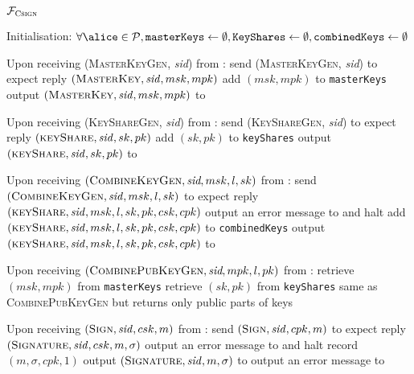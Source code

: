 \begin{systembox}{$\mathcal{F}_{\textsc{Csign}}$}
  \begin{algorithmic}[1]
    \State Initialisation:
    \Indent
      \State $\forall \alice \in \mathcal{P}, \mathtt{masterKeys} \gets
      \emptyset, \mathtt{KeyShares} \gets \emptyset, \mathtt{combinedKeys}
      \gets \emptyset$
    \EndIndent
    \State

    \State Upon receiving (\textsc{MasterKeyGen}, \textit{sid}) from \alice:
    \Indent
      \State send (\textsc{MasterKeyGen}, \textit{sid}) to \adversary
      \State expect reply $(\textsc{MasterKey}, \mathit{sid}, msk, mpk)$
      \State add $(msk, mpk)$ to \texttt{masterKeys}
      \State output $(\textsc{MasterKey}, \mathit{sid}, msk, mpk)$ to \alice
    \EndIndent
    \State

    \State Upon receiving (\textsc{KeyShareGen}, \textit{sid}) from \alice:
    \Indent
      \State send (\textsc{KeyShareGen}, \textit{sid}) to \adversary
      \State expect reply $(\textsc{keyShare}, \mathit{sid}, sk, pk)$
      \State add $(sk, pk)$ to \texttt{keyShares}
      \State output $(\textsc{keyShare}, \mathit{sid}, sk, pk)$ to \alice
    \EndIndent
    \State

    \State Upon receiving $(\textsc{CombineKeyGen}, \textit{sid}, msk, l,
    sk)$ from \alice:
    \Indent
      \State send $(\textsc{CombineKeyGen}, \mathit{sid}, msk, l, sk)$ to
      \adversary
      \State expect reply $(\textsc{keyShare}, \mathit{sid}, msk, l, sk, pk,
      csk, cpk)$
        \State output an error message to \alice{} and halt
        \State add $(\textsc{keyShare}, \mathit{sid}, msk, l, sk, pk, csk,
        cpk)$ to \texttt{combinedKeys}
      \EndIf
        \State output $(\textsc{keyShare}, \mathit{sid}, msk, l, sk, pk,
        csk, cpk)$ to \alice
    \EndIndent
    \State

    \State Upon receiving $(\textsc{CombinePubKeyGen}, \textit{sid}, mpk, l,
    pk)$ from \alice:
    \Indent
      \State retrieve $(msk, mpk)$ from \texttt{masterKeys}
      \State retrieve $(sk, pk)$ from \texttt{keyShares}
      \State same as \textsc{CombinePubKeyGen} but returns only public parts
      of keys
    \EndIndent
    \State

    \State Upon receiving $(\textsc{Sign}, \mathit{sid}, csk, m)$ from \alice:
    \Indent
        \State send $(\textsc{Sign}, \mathit{sid}, cpk, m)$ to \adversary
        \State expect reply $(\textsc{Signature}, \mathit{sid}, csk, m,
        \sigma)$
          \State output an error message to \alice{} and halt
        \Else
          \State record $(m, \sigma, cpk, 1)$
          \State output $(\textsc{Signature}, \mathit{sid}, m, \sigma)$ to
          \alice
        \EndIf
      \Else {}
        \State output an error message to \alice{}
      \EndIf
    \EndIndent
    \State


\end{algorithmic}
\end{systembox}
